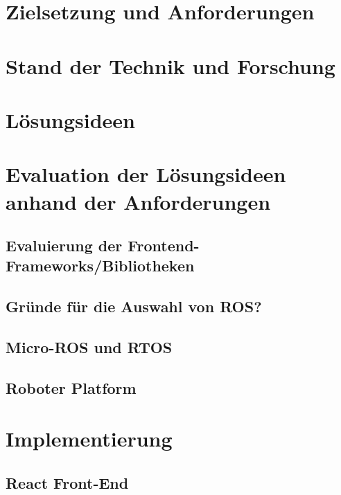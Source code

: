\documentclass[11pt,oneside,a4paper,titlepage]{article}
\begin{document}
\section{Zielsetzung und Anforderungen}


\section{Stand der Technik und Forschung}


\section{Lösungsideen}


\section{Evaluation der Lösungsideen anhand der Anforderungen}

\subsection{Evaluierung der Frontend-Frameworks/Bibliotheken}


\subsection{Gründe für die Auswahl von ROS?}


\subsection{Micro-ROS und RTOS}


\subsection{Roboter Platform}


\section{Implementierung}

\subsection{React Front-End}
\end{document}
